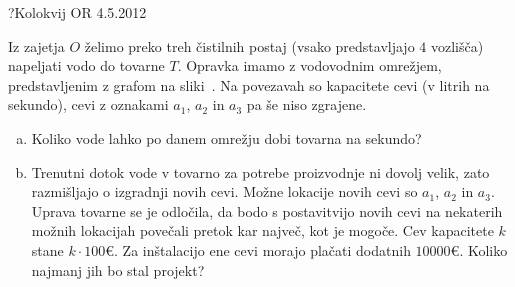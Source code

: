 \begin{naloga}{?}{Kolokvij OR 4.5.2012}
\begin{vprasanje}
Iz zajetja $O$ želimo preko treh čistilnih postaj
(vsako predstavljajo $4$ vozlišča)
napeljati vodo do tovarne $T$.
Opravka imamo z vodovodnim omrežjem,
pred\-stav\-lje\-nim z grafom na sliki~\fig{}.
Na povezavah so kapacitete cevi (v litrih na sekundo),
cevi z oznakami $a_1$, $a_2$ in $a_3$ pa še niso zgrajene.

\begin{enumerate}[(a)]
\item Koliko vode lahko po danem omrežju dobi tovarna na sekundo?

\item Trenutni dotok vode v tovarno za potrebe proizvodnje ni dovolj velik,
zato razmišljajo o izgradnji novih cevi.
Možne lokacije novih cevi so $a_1$, $a_2$ in $a_3$.
Uprava tovarne se je odločila,
da bodo s postavitvijo novih cevi na nekaterih možnih lokacijah
povečali pretok kar največ, kot je mogoče.
Cev kapacitete $k$ stane $k \cdot 100 €$.
Za inštalacijo ene cevi morajo plačati dodatnih $10000 €$.
Koliko najmanj jih bo stal projekt?
\end{enumerate}

\begin{slika}
\makebox[\textwidth][c]{
\pgfslika
}
\end{slika}
\end{vprasanje}
\begin{odgovor}
\end{odgovor}
\end{naloga}
